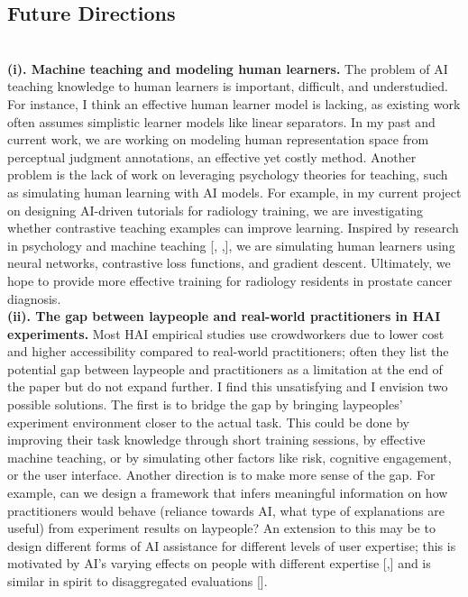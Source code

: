 \subsection*{Future Directions}



\noindent \textbf{\\(i). Machine teaching and modeling human learners.} 
The problem of AI teaching knowledge to human learners is important, difficult, and understudied. For instance, I think an effective human learner model is lacking, as existing work often assumes simplistic learner models like linear separators. In my past and current work, we are working on modeling human representation space from perceptual judgment annotations, an effective yet costly method. Another problem is the lack of work on leveraging psychology theories for teaching, such as simulating human learning with AI models. For example, in my current project on designing AI-driven tutorials for radiology training, we are investigating whether contrastive teaching examples can improve learning. Inspired by research in psychology and machine teaching [, ,], we are simulating human learners using neural networks, contrastive loss functions, and gradient descent. Ultimately, we hope to provide more effective training for radiology residents in prostate cancer diagnosis.
\noindent \textbf{\\(ii). The gap between laypeople and real-world practitioners in HAI experiments.}
Most HAI empirical studies use crowdworkers due to lower cost and higher accessibility compared to real-world practitioners; often they list the potential gap between laypeople and practitioners as a limitation at the end of the paper but do not expand further. I find this unsatisfying and I envision two possible solutions. The first is to bridge the gap by bringing laypeoples’ experiment environment closer to the actual task. This could be done by improving their task knowledge through short training sessions, by effective machine teaching, or by simulating other factors like risk, cognitive engagement, or the user interface. Another direction is to make more sense of the gap. For example, can we design a framework that infers meaningful information on how practitioners would behave (reliance towards AI, what type of explanations are useful) from experiment results on laypeople? An extension to this may be to design different forms of AI assistance for different levels of user expertise; this is motivated by AI's varying effects on people with different expertise [,] and is similar in spirit to disaggregated evaluations [].
